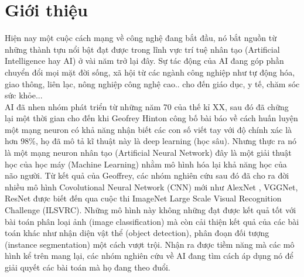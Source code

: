 


\chapter{Giới thiệu}
Hiện nay một cuộc cách mạng về công nghệ đang bắt đầu, nó bắt nguồn từ những thành tựu nổi bật đạt được trong lĩnh vực trí tuệ nhân tạo (Artificial Intelligence hay AI) ở vài năm trở lại đây. Sự tác động của AI đang góp phần chuyển đổi mọi mặt đời sống, xã hội từ các ngành công nghiệp như tự động hóa, giao thông, liên lạc, nông nghiệp công nghệ cao.. cho đến giáo dục, y tế, chăm sóc sức khỏe...\\

  AI đã nhen nhóm phát triển từ những năm 70 của thế kỉ XX, sau đó đã chững lại một thời gian cho đến khi Geofrey Hinton công bố bài báo \cite{GeoffHinton2006} về cách huấn luyện một mạng neuron có khả năng nhận biết các con số viết tay với độ chính xác là hơn 98\%, họ đã mô tả kĩ thuật này là deep learning (học sâu). Nhưng thực ra nó là một mạng neuron nhân tạo (Artificial Neural Network) đây là một giải thuật học của học máy (Machine Learning) nhằm mô hình hóa lại khả năng học của não người.
Từ kết quả của Geoffrey, các nhóm nghiên cứu sau đó đã cho ra đời nhiều mô hình Covolutional Neural Network (CNN) mới như AlexNet\cite{Krizhevsky2012} , VGGNet\cite{Simonyan2014}, ResNet\cite{KHe2015} được biết đến qua cuộc thi ImageNet Large Scale Visual Recognition Challenge (ILSVRC). Những mô hình này không những đạt được kết quả tốt với bài toán phân loại ảnh (image classification) mà còn cải thiện kết quả của các bài toán khác như nhận diện vật thể  (object detection), phân đoạn đối tượng (instance segmentation) một cách vượt trội. Nhận ra được tiềm năng mà các mô hình kể trên mang lại, các nhóm nghiên cứu về AI đang tìm cách áp dụng nó để giải quyết các bài toán mà họ đang theo đuổi.\\

